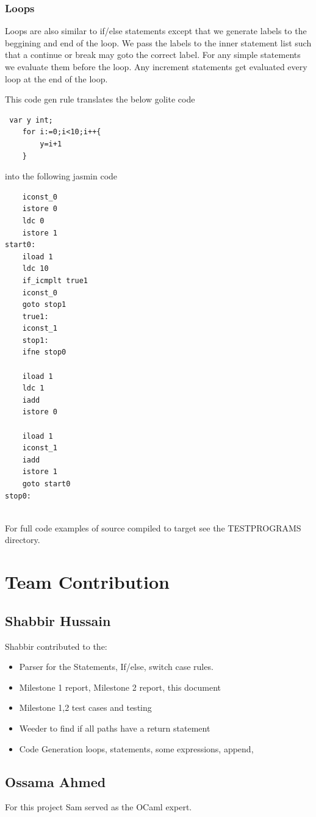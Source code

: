 \documentclass{article}
\begin{document}
\subsubsection*{Loops}
Loops are also similar to if/else statements except that we generate labels to the beggining and end of the loop. We pass the labels to the inner statement list such that a continue or break may goto the correct label. For any simple statements we evaluate them before the loop. Any increment statements get evaluated every loop at the end of the loop.

This code gen rule translates the below golite code
\begin{lstlisting}
 var y int;
    for i:=0;i<10;i++{
        y=i+1
    }

\end{lstlisting}
into the following jasmin code
\begin{lstlisting}
	iconst_0
	istore 0
	ldc 0
	istore 1
start0:
	iload 1
	ldc 10
	if_icmplt true1
	iconst_0
	goto stop1
	true1:
	iconst_1
	stop1:
	ifne stop0

	iload 1
	ldc 1
	iadd
	istore 0
	
	iload 1
	iconst_1
	iadd
	istore 1
	goto start0
stop0:


\end{lstlisting}

For full code examples of source compiled to target see the TESTPROGRAMS directory.

\section{Team Contribution}

\subsection{Shabbir Hussain}
Shabbir contributed to the:
\begin{itemize}
\item Parser for the Statements, If/else, switch case rules.
\item Milestone 1 report, Milestone 2 report, this document
\item Milestone 1,2 test cases and testing
\item Weeder to find if all paths have a return statement
\item Code Generation loops, statements, some expressions, append, 
\end{itemize}

\subsection{Ossama Ahmed}
For this project Sam served as the OCaml expert. 
\end{document}
